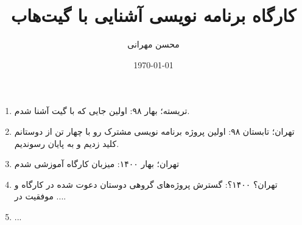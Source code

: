 \documentclass[12pt,onecolumn,a4paper]{article}
\begin{document}
\title{کارگاه برنامه نویسی آشنایی با گیت‌هاب} 
\author{محسن مهرانی}
\date{\today}
\maketitle
{}

\begin{enumerate}[1.]
\item
تریسته؛ بهار ۹۸: اولین جایی که با گیت آشنا شدم.
\item
تهران؛ تابستان ۹۸: اولین پروژه برنامه نویسی مشترک رو با چهار تن از دوستانم کلید زدیم و به پایان رسوندیم.
\item
تهران؛ بهار ۱۴۰۰: میزبان کارگاه آموزشی شدم
\item
تهران؟ ۱۴۰۰؟: گسترش پروژه‌های گروهی دوستان دعوت شده در کارگاه و موفقیت در ....
\item ...
\end{enumerate}
\end{document}
